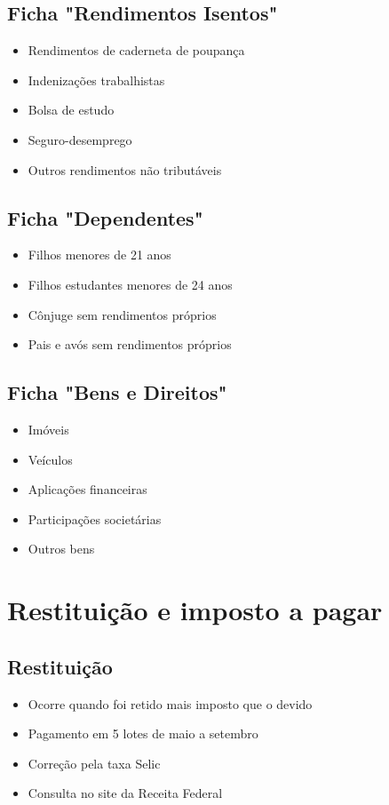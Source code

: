 \documentclass[12pt,a4paper]{article}
\begin{document}
\subsection{Ficha "Rendimentos Isentos"}
\begin{itemize}
    \item Rendimentos de caderneta de poupança
    \item Indenizações trabalhistas
    \item Bolsa de estudo
    \item Seguro-desemprego
    \item Outros rendimentos não tributáveis
\end{itemize}

\subsection{Ficha "Dependentes"}
\begin{itemize}
    \item Filhos menores de 21 anos
    \item Filhos estudantes menores de 24 anos
    \item Cônjuge sem rendimentos próprios
    \item Pais e avós sem rendimentos próprios
\end{itemize}

\subsection{Ficha "Bens e Direitos"}
\begin{itemize}
    \item Imóveis
    \item Veículos
    \item Aplicações financeiras
    \item Participações societárias
    \item Outros bens
\end{itemize}

\section{Restituição e imposto a pagar}

\subsection{Restituição}
\begin{itemize}
    \item Ocorre quando foi retido mais imposto que o devido
    \item Pagamento em 5 lotes de maio a setembro
    \item Correção pela taxa Selic
    \item Consulta no site da Receita Federal
\end{itemize}
\end{document}
